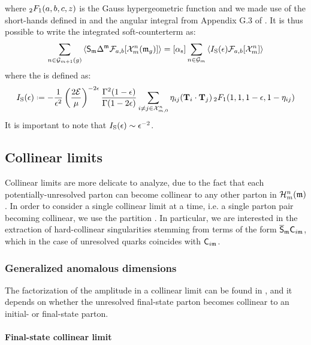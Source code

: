 where $ {_2F_1}(a,b,c,z) $ is the Gauss hypergeometric function and we made use of the short-hands defined in  and the angular integral from Appendix G.3 of \cite{Asteriadis-2020}. It is thus possible to write the integrated soft-counterterm as:
\begin{equation}
  \sum_{n \in \mathcal{G}_{m+1}(g)} \left\langle \mathsf{S}_{\mathfrak{m}} \Delta^{\mathfrak{m}} \mathcal{F}_{a,b}[\mathcal{X}^{n}_{m}(\mathfrak{m}_g)] \right\rangle = [\alpha_\text{s}] \sum_{n \in \mathcal{G}_m} \left\langle I_\text{S}(\epsilon) \mathcal{F}_{a,b}[\mathcal{X}^{n}_{m}] \right\rangle
\end{equation}
where the  is defined as:
\begin{equation}
  \iso(\de) \defeq - \frac{1}{\de^2} \left( \frac{2\ema}{\mu} \right)^{-2\de} \frac{\Gamma^2(1-\de)}{\Gamma(1-2\de)} \sum_{i \neq j \in \fsp{n}{m}} \eta_{ij} (\cc) \,\hyp(1,1,1-\de,1-\eta_{ij})
\end{equation}
It is important to note that $ I_\text{S}(\epsilon) \sim \epsilon^{-2} $.

\subsection{Collinear limits}

Collinear limits are more delicate to analyze, due to the fact that each potentially-unresolved parton can become collinear to any other parton in $ \mathcal{H}^{n}_{m}(\mathfrak{m}) $. In order to consider a single collinear limit at a time, i.e. a single parton pair becoming collinear, we use the partition . In particular, we are interested in the extraction of hard-collinear singularities stemming from terms of the form $ \overline{\mathsf{S}}_{\mathfrak{m}} \mathsf{C}_{i\mathfrak{m}} $, which in the case of unresolved quarks coincides with $ \mathsf{C}_{i\mathfrak{m}} $.

\subsubsection{Generalized anomalous dimensions}

The factorization of the amplitude in a collinear limit can be found in \cite{Catani-1997}, and it depends on whether the unresolved final-state parton becomes collinear to an initial- or final-state parton.

\paragraph{Final-state collinear limit}

